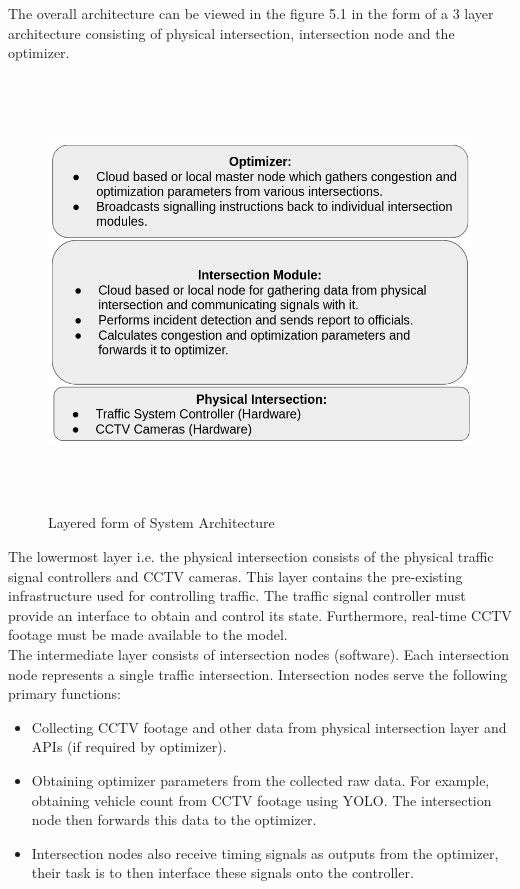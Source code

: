 \documentclass[openany,12pt]{report}
\begin{document}
	\hspace*{0.5in}The overall architecture can be viewed in the figure 5.1 in the form of a  3 layer architecture consisting of physical intersection, intersection node and the optimizer.\\
	\begin{figure}[H]
		\centering
		\includegraphics[width=5.2in,height=4.5in]{./Diagrams/PNG/layered_architecture}
		\caption{Layered form of System Architecture}
	\end{figure}
	
	\hspace*{0.5in}The lowermost layer i.e. the physical intersection consists of the physical traffic signal controllers and CCTV cameras. This layer contains the pre-existing infrastructure used for controlling traffic. The traffic signal controller must provide an interface to obtain and control its state. Furthermore, real-time CCTV footage must be made available to the model.\\
	
	\hspace*{0.5in}The intermediate layer consists of intersection nodes (software). Each intersection node represents a single traffic intersection. Intersection nodes serve the following primary functions:\\
	
	\begin{itemize}
		\item{Collecting CCTV footage and other data from physical intersection layer and APIs (if required by optimizer).}
		\item{Obtaining optimizer parameters from the collected raw data. For example, obtaining vehicle count from CCTV footage using YOLO. The intersection node then forwards this data to the optimizer.}
		\item{Intersection nodes also receive timing signals as outputs from the optimizer, their task is to then interface these signals onto the controller.}
	\end{itemize}
	
\end{document}
